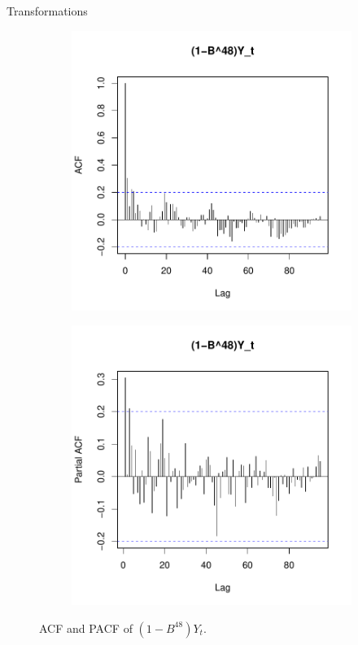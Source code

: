 \begin{subsection}{Transformations}
  \begin{figure}[!h]
    \begin{subfigure}[b]{.48\textwidth}
      \centering
      \includegraphics[scale=0.5]{../analysis/plots/seasonal_acf}
    \end{subfigure}
    \begin{subfigure}[b]{.48\textwidth}
      \centering
      \includegraphics[scale=0.5]{../analysis/plots/seasonal_pacf}
    \end{subfigure}
    \caption{ACF and PACF of $\left(1 - B^{48}\right)Y_t$.}\label{cf_seasonal}
  \end{figure}


\end{subsection}
